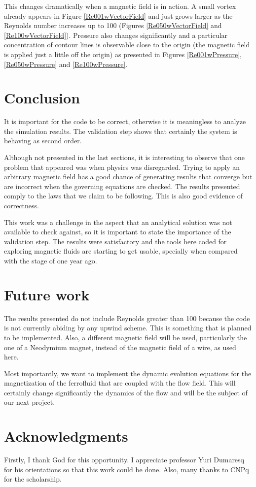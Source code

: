 \documentclass[journal]{IEEEtran}
\begin{document}
This changes dramatically when a magnetic field is in action. A small vortex already appears in Figure \ref{Re001wVectorField} and just grows larger as the Reynolds number increases up to 100 (Figures \ref{Re050wVectorField} and \ref{Re100wVectorField}). Pressure also changes significantly and a particular concentration of contour lines is observable close to the origin (the magnetic field is applied just a little off the origin) as presented in Figures \ref{Re001wPressure}, \ref{Re050wPressure} and \ref{Re100wPressure}.


\section{Conclusion}

It is important for the code to be correct, otherwise it is meaningless to analyze the simulation results. The validation step shows that certainly the system is behaving as second order. 

Although not presented in the last sections, it is interesting to observe that one problem that appeared was when physics was disregarded. Trying to apply an arbitrary magnetic field has a good chance of generating results that converge but are incorrect when the governing equations are checked. The results presented comply to the laws that we claim to be following. This is also good evidence of correctness.

This work was a challenge in the aspect that an analytical solution was not available to check against, so it is important to state the importance of the validation step. The results were satisfactory and the tools here coded for exploring magnetic fluids are starting to get usable, specially when compared with the stage of one year ago.


\section{Future work}
The results presented do not include Reynolds greater than 100 because the code is not currently abiding by any upwind scheme. This is something that is planned to be implemented. Also, a different magnetic field will be used, particularly the one of a Neodymium magnet, instead of the magnetic field of a wire, as used here.

Most importantly, we want to implement the dynamic evolution equations for the magnetization of the ferrofluid that are coupled with the flow field. This will certainly change significantly the dynamics of the flow and will be the subject of our next project.




\section*{Acknowledgments}

Firstly, I thank God for this opportunity. I appreciate professor Yuri Dumaresq for his orientations so that this work could be done. Also, many thanks to CNPq for the scholarship.




\end{document}

